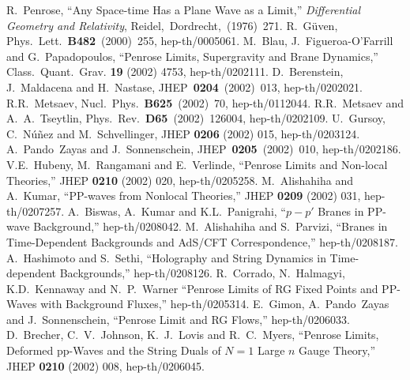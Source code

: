 \documentclass[a4paper,12pt]{article}
\begin{document}
 
\begin{thebibliography}{99}
R.~Penrose,
``Any Space-time Has a Plane Wave as a Limit,''
{\it Differential Geometry and Relativity},  
Reidel,~Dordrecht,~(1976)~271. 
R.~G\"{u}ven,
Phys.~Lett.~{\bf B482}~(2000)~255,
hep-th/0005061.
M.~Blau, J.~Figueroa-O'Farrill and G.~Papadopoulos,
``Penrose Limits, Supergravity and Brane Dynamics,''
Class.~Quant.~Grav. {\bf 19} (2002) 4753, hep-th/0202111.
D.~Berenstein, J.~Maldacena and H.~Nastase,
JHEP~{\bf 0204}~(2002)~013, hep-th/0202021.
R.R.~Metsaev,
Nucl.~Phys.~{\bf B625}~(2002)~70, 
hep-th/0112044.
R.R.~Metsaev and A.~A.~Tseytlin, 
Phys.~Rev.~{\bf D65}~(2002)~126004, hep-th/0202109.
U.~Gursoy, C.~N\'{u}\~{n}ez and M.~Schvellinger,
JHEP {\bf 0206} (2002) 015, hep-th/0203124.
A.~Pando~Zayas and J.~Sonnenschein,
JHEP~{\bf 0205}~(2002)~010, hep-th/0202186.
V.E.~Hubeny, M.~Rangamani and E.~Verlinde,
``Penrose Limits and Non-local Theories,''
JHEP {\bf 0210} (2002) 020, hep-th/0205258.
M.~Alishahiha and A.~Kumar,
``PP-waves from Nonlocal Theories,''
JHEP {\bf 0209} (2002) 031, hep-th/0207257.
A.~Biswas, A.~Kumar and K.L.~Panigrahi,
``$p-p'$ Branes in PP-wave Background,''
hep-th/0208042.
M.~Alishahiha and S.~Parvizi,
``Branes in Time-Dependent Backgrounds and AdS/CFT Correspondence,''
hep-th/0208187.
A.~Hashimoto and S.~Sethi,
``Holography and String Dynamics in Time-dependent Backgrounds,''
hep-th/0208126.
R.~Corrado, N.~Halmagyi, K.D.~Kennaway and N.~P.~Warner
``Penrose Limits of RG Fixed Points and PP-Waves with Background Fluxes,''
hep-th/0205314.
E.~Gimon, A.~Pando~Zayas and J.~Sonnenschein,
``Penrose Limit and RG Flows,''
hep-th/0206033.
D.~Brecher, C.~V.~Johnson, K.~J.~Lovis and R.~C.~Myers,
``Penrose Limits, Deformed pp-Waves and the String Duals of $N=1$ Large $n$
	Gauge Theory,''
JHEP {\bf 0210} (2002) 008, hep-th/0206045.

\end{thebibliography}
\end{document}
